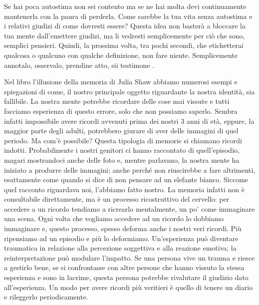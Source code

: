 \documentclass[12pt]{book} %
\begin{document}
Se hai poca autostima non sei contento ma se ne hai molta devi continuamente mantenerla con la paura di perderla. Come
sarebbe la tua vita senza autostima e i relativi giudizi di come dovresti essere? Questa idea non basterà a bloccare la
tua mente dall'emettere giudizi, ma li vedresti semplicemente per ciò che sono, semplici pensieri.
Quindi, la prossima volta, tra pochi secondi, che etichetterai qualcosa o qualcuno con qualche definizione, non fare
niente. Semplicemente annotalo, osservalo, prendine atto, sii
testimone
.

\begin{mdframed}[linewidth=1pt]
Nel libro l'illusione della memoria di Julia Shaw abbiamo numerosi esempi
e spiegazioni di come, il nostro principale oggetto riguardante la nostra identità, sia fallibile. La nostra mente
potrebbe ricordare delle cose mai vissute e tutti facciamo esperienza di questo errore, solo che non possiamo saperlo.
Sembra infatti impossibile avere ricordi avvenuti prima dei nostri 3 anni di età, eppure, la maggior parte degli adulti, potrebbero giurare
di aver delle immagini di quel periodo. Ma com'è possibile? Questa tipologia di memorie si
chiamano ricordi indotti. Probabilmente i nostri genitori ci hanno raccontato di quell'episodio,
magari mostrandoci anche delle foto e, mentre parlavano, la nostra mente ha iniziato a produrre delle immagini; anche
perché non riuscirebbe a fare altrimenti, esattamente come quando si dice di non pensare ad un elefante bianco. Siccome
quel racconto riguardava noi, l'abbiamo fatto nostro. La memoria infatti non è consultabile
direttamente, ma è un processo ricostruttivo del cervello: per accedere a un ricordo tendiamo a ricrearlo mentalmente, un po’ come immaginare una scena. Ogni volta che vogliamo accedere ad un ricordo lo dobbiamo immaginare e, questo processo, spesso deforma anche i nostri veri ricordi. Più
ripensiamo ad un episodio e più lo deformiamo. Un’esperienza può diventare traumatica in relazione alla percezione soggettiva e alla reazione emotiva; la reinterpretazione può modulare l’impatto. Se una persona vive un trauma e riesce a gestirlo bene, se si confrontasse con altre persone che hanno
vissuto la stessa esperienza e sono in lacrime, questa persona potrebbe rivalutare il giudizio dato all'esperienza. Un
modo per avere ricordi più veritieri è quello di tenere un diario e rileggerlo periodicamente.


\end{mdframed}
\end{document}
